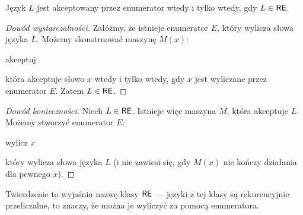 \begin{theorem}\label{t:enumerator iff RE}
    Język $L$ jest akceptowany przez enumerator wtedy i tylko wtedy, gdy $L \in \textsf{RE}$.
\end{theorem}
\begin{proof}[Dowód wystarczalności]
    Załóżmy, że istnieje enumerator $E$, który wylicza słowa języka $L$. Możemy skonstruować maszynę $M(x)$:
    \begin{algorithmic}
                \State akceptuj
            \EndIf
        \EndFor
    \end{algorithmic}
    która akceptuje słowo $x$ wtedy i tylko wtedy, gdy $x$ jest wyliczane przez enumerator $E$. Zatem $L \in \textsf{RE}$.
\end{proof}
\begin{proof}[Dowód konieczności]
    Niech $L \in \textsf{RE}$. Istnieje więc maszyna $M$, która akceptuje $L$. Możemy stworzyć enumerator $E$:
    \begin{algorithmic}
                    \State wylicz $x$
                \EndIf
            \EndFor
        \EndFor
    \end{algorithmic}
    który wylicza słowa języka $L$ (i nie zawiesi się, gdy $M(x)$ nie kończy działania dla pewnego $x$).
\end{proof}

Twierdzenie to wyjaśnia nazwę klasy $\textsf{RE}$ --- języki z tej klasy są rekurencyjnie przeliczalne, to znaczy, że można je wyliczyć za pomocą enumeratora.

